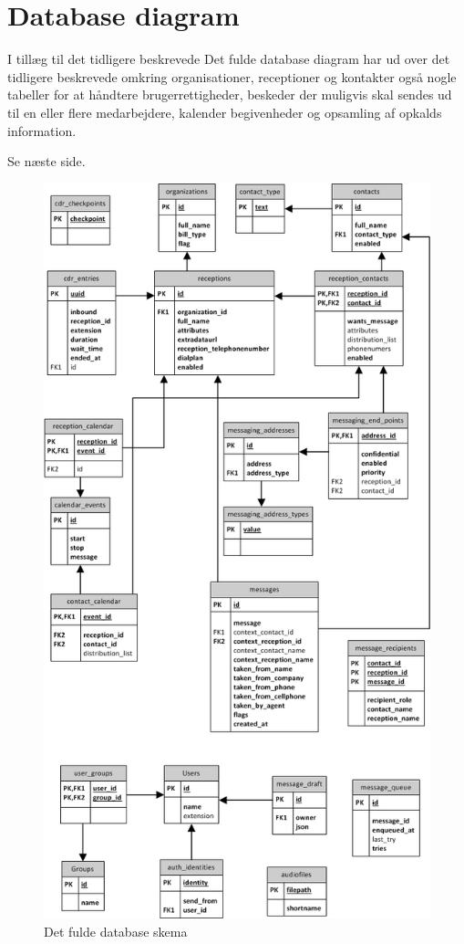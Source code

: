 \chapter{Database diagram}
I tillæg til det tidligere beskrevede 
Det fulde database diagram har ud over det tidligere beskrevede omkring organisationer, receptioner og kontakter også nogle tabeller for at håndtere brugerrettigheder, beskeder der muligvis skal sendes ud til en eller flere medarbejdere, kalender begivenheder og opsamling af opkalds information.


Se næste side.

\pagebreak
\begin{figure}[ht!]
\centering
\includegraphics[height=\textheight]{images/ER_Full.png}
\caption{Det fulde database skema}
\label{fig:erfull}
\end{figure}

